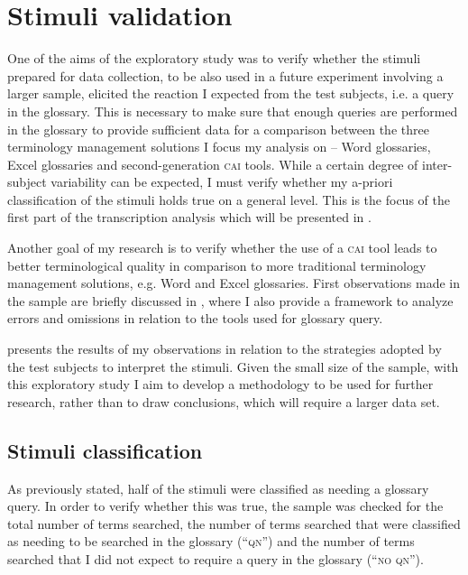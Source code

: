 \documentclass[output=paper]{langsci/langscibook}
\begin{document}
\section{Stimuli validation}\label{sec:prandi:5}
One of the aims of the exploratory study was to verify whether the stimuli prepared for data collection, to be also used in a future experiment involving a larger sample, elicited the reaction I expected from the test subjects, i.e. a query in the glossary. This is necessary to make sure that enough queries are performed in the glossary to provide sufficient data for a comparison between the three terminology management solutions I focus my analysis on – Word glossaries, Excel glossaries and second-generation \textsc{cai} tools. While a certain degree of inter-subject variability can be expected, I must verify whether my a-priori classification of the stimuli holds true on a general level. This is the focus of the first part of the transcription analysis which will be presented in .

Another goal of my research is to verify whether the use of a \textsc{cai} tool leads to better terminological quality in comparison to more traditional terminology management solutions, e.g. Word and Excel glossaries. First observations made in the sample are briefly discussed in , where I also provide a framework to analyze errors and omissions in relation to the tools used for glossary query.

presents the results of my observations in relation to the strategies adopt\-ed by the test subjects to interpret the stimuli. Given the small size of the sample, with this exploratory study I aim to develop a methodology to be used for further research, rather than to draw conclusions, which will require a larger data set. 

\subsection{Stimuli classification}\label{sec:prandi:5.1}
As previously stated, half of the stimuli were classified as needing a glossary query. In order to verify whether this was true, the sample was checked for the total number of terms searched, the number of terms searched that were classified as needing to be searched in the glossary (``\textsc{qn}'') and the number of terms searched that I did not expect to require a query in the glossary (``\textsc{no qn}''). 
\end{document}
